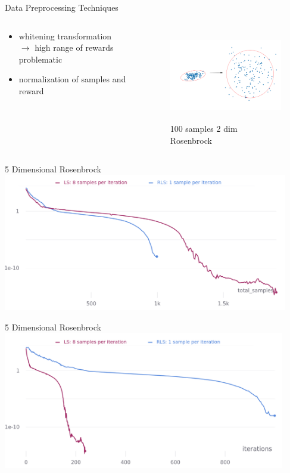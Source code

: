 \documentclass[navbarinfooter, 12pt]{sdqbeamer}
\begin{document}
\begin{frame}{Data Preprocessing Techniques}
\begin{columns}[c]
  \begin{column}{8cm}
  \begin{itemize}
    \item whitening transformation \\ $\rightarrow$ high range of rewards problematic
    \item normalization of samples and reward
  \end{itemize}
  \end{column}
  \begin{column}{6cm}
    \begin{figure}[h!]
      \includegraphics[height=4cm]{figures/white.png}
      \caption*{100 samples 2 dim Rosenbrock}
     \end{figure}
  \end{column}
\end{columns}  

\end{frame}


\begin{frame}{5 Dimensional Rosenbrock}
  \centering
  \includegraphics[height=6cm]{figures/totals_dim5.png}    
\end{frame}

\begin{frame}{5 Dimensional Rosenbrock}
  \centering
  \includegraphics[height=6cm]{figures/iters_dim5.png}
\end{frame}
\end{document}
